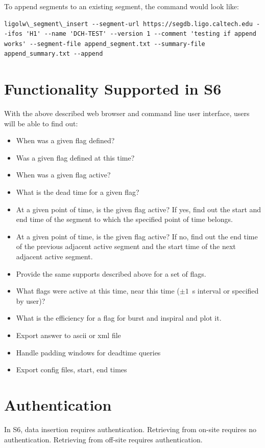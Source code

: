 To append segments to an existing segment, the command would look like:
\begin{verbatim}
ligolw\_segment\_insert --segment-url https://segdb.ligo.caltech.edu --ifos 'H1' --name 'DCH-TEST' --version 1 --comment 'testing if append works' --segment-file append_segment.txt --summary-file append_summary.txt --append
\end{verbatim}
\section{Functionality Supported in S6}
With the above described web browser and command line user interface, users will be able to find out:
\begin{itemize}
\item When was a given flag defined?
\item Was a given flag defined at this time?
\item When was a given flag active?
\item What is the dead time for a given flag? 
\item At a given point of time, is the given flag active? If yes, find out the start and end time of the segment to which the specified point of time belongs.
\item At a given point of time, is the given flag active? If no, find out the end time of the previous adjacent active segment and the start time of the next adjacent active segment.
\item Provide the same supports described above for a set of flags.
\item What flags were active at this time, near this time ($\pm 1$~s interval or specified by user)?
\item What is the efficiency for a flag for burst and inspiral and plot it.
\item Export answer to ascii or xml file
\item Handle padding windows for deadtime queries
\item Export config files, start, end times
\end{itemize}


\section{Authentication}
In S6, data insertion requires authentication. Retrieving from on-site requires no authentication. Retrieving from off-site requires authentication. 

